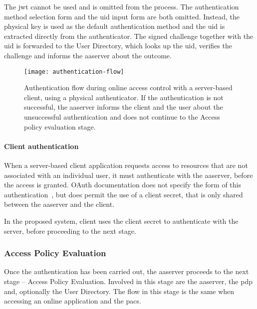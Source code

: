 The \acrshort{jwt} cannot be used and is omitted from the process. The authentication method selection form and the \acrshort{uid} input form are both omitted. Instead, the physical key is used as the default authentication method and the \acrshort{uid} is extracted directly from the authenticator. The signed challenge together with the \acrshort{uid} is forwarded to the User Directory, which looks up the \acrshort{uid}, verifies the challenge and informs the \acrshort{aaserver} about the outcome.

\begin{sidewaysfigure}[tpb]
    \centering
    \texttt{[image: authentication-flow]}
    \caption{Authentication flow during online access control with a server-based client, using a physical authenticator. If the authentication is not successful, the \acrshort{aaserver} informs the client and the user about the unsuccessful authentication and does not continue to the Access policy evaluation stage.}
    \label{fig:authentication-flow}
\end{sidewaysfigure}
\restoregeometry

\paragraph{Client authentication}
When a server-based client application requests access to resources that are not associated with an individual user, it must authenticate with the \acrshort{aaserver}, before the access is granted. OAuth documentation does not specify the form of this authentication~\cite{Hardt2012TheFramework}, but does permit the use of a client secret, that is only shared between the \acrshort{aaserver} and the client.

In the proposed system, client uses the client secret to authenticate with the server, before proceeding to the next stage.

\subsubsection{Access Policy Evaluation}
Once the authentication has been carried out, the \acrshort{aaserver} proceeds to the next stage -- Access Policy Evaluation. Involved in this stage are the \acrshort{aaserver}, the \acrshort{pdp} and, optionally the User Directory. The flow in this stage is the same when accessing an online application and the \acrshort{pacs}.

